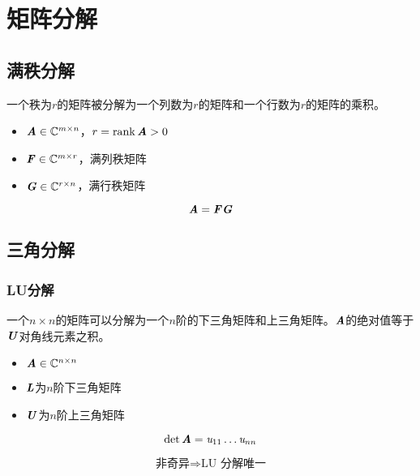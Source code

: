 \chapter{矩阵分解}
\label{cha:矩阵分解}



\section{满秩分解}
\label{sec:满秩分解}

\begin{definition}[满秩分解]
    一个秩为$r$的矩阵被分解为一个列数为$r$的矩阵和一个行数为$r$的矩阵的乘积。

    \begin{itemize}
        \item $\boldsymbol{\mathit{A}} \in \mathbb{C}^{m \times n}$，$r = \mathrm{rank}\, \boldsymbol{\mathit{A}} > 0$
        \item $\boldsymbol{\mathit{F}} \in \mathbb{C}^{m \times r}$，满列秩矩阵
        \item $\boldsymbol{\mathit{G}} \in \mathbb{C}^{r \times n}$，满行秩矩阵
    \end{itemize}

    $$
    \boldsymbol{\mathit{A}} = \boldsymbol{\mathit{F}} \boldsymbol{\mathit{G}}
    $$
\end{definition}

\section{三角分解}
\label{sec:三角分解}

\subsection{LU分解}
\label{sub:LU分解}

\begin{definition}[LU分解]

    一个$n \times n$的矩阵可以分解为一个$n$阶的下三角矩阵和上三角矩阵。$\boldsymbol{\mathit{A}}$的绝对值等于$\boldsymbol{\mathit{U}}$对角线元素之积。

    \begin{itemize}
        \item $\boldsymbol{\mathit{A}} \in \mathbb{C}^{n \times n}$
        \item $\boldsymbol{\mathit{L}}$为$n$阶下三角矩阵
        \item $\boldsymbol{\mathit{U}}$为$n$阶上三角矩阵
    \end{itemize}

    $$
    \det \boldsymbol{\mathit{A}} = \mathit{u}_{11}\ldots \mathit{u}_{nn}
    $$

    $$
    \text{非奇异} \Longrightarrow \text{LU 分解唯一}
    $$

\end{definition}

